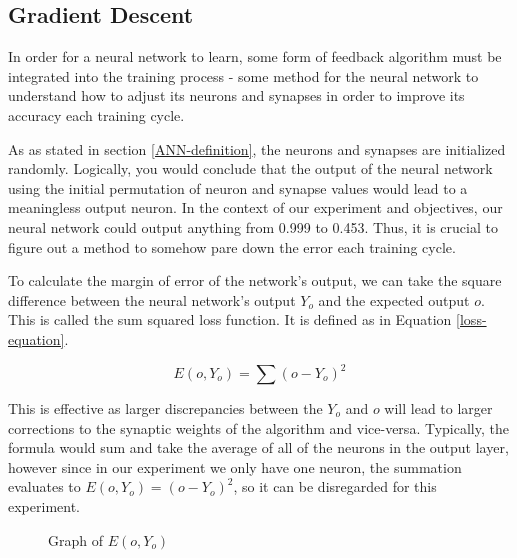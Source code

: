 \documentclass[12pt]{article}
\begin{document}
\subsection{Gradient Descent \label{gradient-descent}}

In order for a neural network to learn, some form of feedback algorithm must be integrated into the training process - some method for the neural network to understand how to adjust its neurons and synapses in order to improve its accuracy each training cycle.

As as stated in section \ref{ANN-definition}, the neurons and synapses are initialized randomly. Logically, you would conclude that the output of the neural network using the initial permutation of neuron and synapse values would lead to a meaningless output neuron. In the context of our experiment and objectives, our neural network could output anything from 0.999 to 0.453. Thus, it is crucial to figure out a method to somehow pare down the error each training cycle.

To calculate the margin of error of the network's output, we can take the square difference between the neural network's output \(Y_o\) and the expected output \(o\). This is called the sum squared loss function. It is defined as in Equation \ref{loss-equation}.

\begin{equation} \label{loss-equation}
  E(o , Y_o) = \sum (o - Y_o)^2
\end{equation}

This is effective as larger discrepancies between the $Y_o$ and $o$ will lead to larger corrections to the synaptic weights of the algorithm and vice-versa. Typically, the formula would sum and take the average of all of the neurons in the output layer, however since in our experiment we only have one neuron, the summation evaluates to $E(o , Y_o) = (o - Y_o)^2$, so it can be disregarded for this experiment.

\begin{figure}[h]
  \centering
  \caption{Graph of $E(o, Y_o)$ \label{errorgraph}}
\end{figure}
\end{document}

